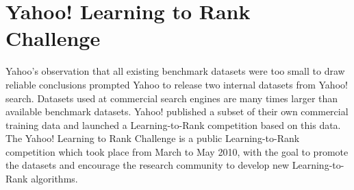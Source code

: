 \chapter{Yahoo! Learning to Rank Challenge}
Yahoo's observation that all existing benchmark datasets were too small to draw reliable conclusions prompted Yahoo to release two internal datasets from Yahoo! search. Datasets used at commercial search engines are many times larger than available benchmark datasets. Yahoo! published a subset of their own commercial training data and launched a Learning-to-Rank competition based on this data. The Yahoo! Learning to Rank Challenge \cite{Chapelle2011a} is a public Learning-to-Rank competition which took place from March to May 2010, with the goal to promote the datasets and encourage the research community to develop new Learning-to-Rank algorithms.\\

